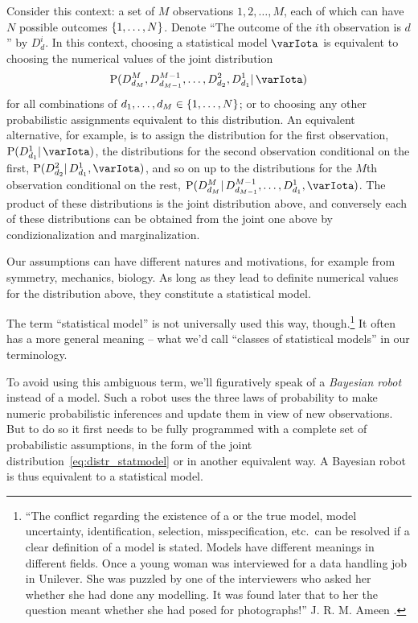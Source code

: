 \documentclass[\ifafour a4paper,12pt,\else a5paper,10pt,\fi%
onecolumn,oneside,article,%
british%
]{memoir}
\theoremstyle{remark}
\theoremstyle{innote}
\newcommand*{\citep}{\parencites}
\DeclarePairedDelimiter\set{\{}{\}}
\newcommand*{\p}{\mathrm{P}}%
\renewcommand*{\|}{\mathpunct{|}}
\newcommand*{\yI}{\varIota}
\begin{document}
Consider this context: a set of $M$ observations $1,2,\dotsc,M$, each of
which can have $N$ possible outcomes $\set{1,\dotsc,N}$. Denote \enquote{The
  outcome of the $i$th observation is $d$} by $D^i_d$. In this context,
choosing a statistical model $\yI$ is equivalent to choosing the numerical
values of the joint distribution
\begin{equation}
  \label{eq:distr_statmodel}
  \p( D^M_{d_M}, D^{M-1}_{d_{M-1}}, \dotsc,  D^2_{d_2}, D^1_{d_1} \|  \yI)
\end{equation}
for all combinations of $d_1,\dotsc,d_M \in \set{1,\dotsc,N}$; or to
choosing any other probabilistic assignments equivalent to this
distribution. An equivalent alternative, for example, is to assign the
distribution for the first observation, $\p(D^1_{d_1} \|\yI)$, the
distributions for the second observation conditional on the first,
$\p(D^2_{d_2} \|D^1_{d_1}, \yI)$, and so on up to the distributions for the
$M$th observation conditional on the rest,
$\p(D^M_{d_M} \| D^{M-1}_{d_{M-1}},\dotsc,D^1_{d_1},\yI)$. The product of
these distributions is the joint distribution above, and conversely each of
these distributions can be obtained from the joint one above by
condizionalization and marginalization.

Our assumptions can have different natures and motivations, for example
from symmetry, mechanics, biology. As long as they lead to definite
numerical values for the distribution above, they constitute a statistical
model.

The term \enquote{statistical model} is not universally used this way,
though.\footnote{\enquote{The conflict regarding the existence of a or the
    true model, model uncertainty, identification, selection,
    misspecification, etc.\ can be resolved if a clear definition of a
    model is stated. Models have different meanings in different fields.
    Once a young woman was interviewed for a data handling job in Unilever.
    She was puzzled by one of the interviewers who asked her whether she
    had done any modelling. It was found later that to her the question
    meant whether she had posed for photographs!} J. R. M. Ameen
  \citep[p.~453]{copasetal1995}.} It often has a more general meaning --
what we'd call \enquote{classes of statistical models} in our terminology.

To avoid using this ambiguous term, we'll figuratively speak of a
\emph{Bayesian robot} instead of a model. Such a robot uses the three laws
of probability to make numeric probabilistic inferences and update them in
view of new observations. But to do so it first needs to be fully
programmed with a complete set of probabilistic assumptions, in the form of
the joint distribution~\eqref{eq:distr_statmodel} or in another equivalent
way. A Bayesian robot is thus equivalent to a statistical model.
\end{document}
